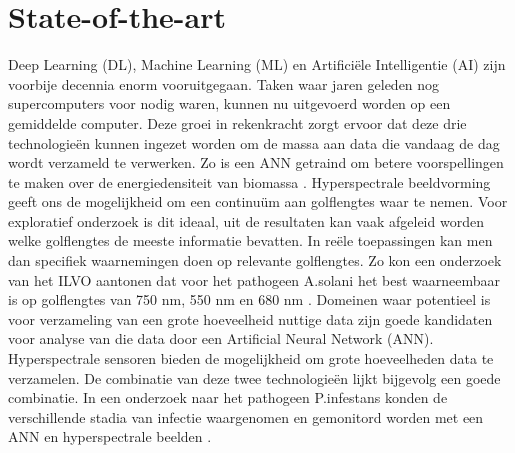 
\section{State-of-the-art}%
\label{sec:state-of-the-art}


Deep Learning (DL), Machine Learning (ML) en Artificiële Intelligentie (AI) zijn voorbije decennia enorm vooruitgegaan. Taken waar jaren geleden nog supercomputers voor nodig waren, kunnen nu uitgevoerd worden op een gemiddelde computer. Deze groei in rekenkracht zorgt ervoor dat deze drie technologieën kunnen ingezet worden om de massa aan data die vandaag de dag wordt verzameld te verwerken. Zo is een ANN getraind om betere voorspellingen te maken over de energiedensiteit van biomassa \autocite{Veza2022}. Hyperspectrale beeldvorming geeft ons de mogelijkheid om een  continuüm aan golflengtes waar te nemen. Voor exploratief onderzoek is dit ideaal, uit de resultaten kan vaak afgeleid worden welke golflengtes de meeste informatie bevatten. In reële toepassingen kan men dan specifiek waarnemingen doen op relevante golflengtes. Zo kon een onderzoek van het ILVO aantonen dat voor het pathogeen A.solani het best waarneembaar is op golflengtes van 750 nm, 550 nm en 680 nm \autocite{Vijver2020}. Domeinen waar potentieel is voor verzameling van een grote hoeveelheid nuttige data zijn goede kandidaten voor analyse van die data door een Artificial Neural Network (ANN). Hyperspectrale sensoren bieden de mogelijkheid om grote hoeveelheden data te verzamelen. De combinatie van deze twee technologieën lijkt bijgevolg een goede combinatie. In een onderzoek naar het pathogeen P.infestans konden de verschillende stadia van infectie waargenomen en gemonitord worden met een ANN en hyperspectrale beelden \autocite{Wang2008}.

